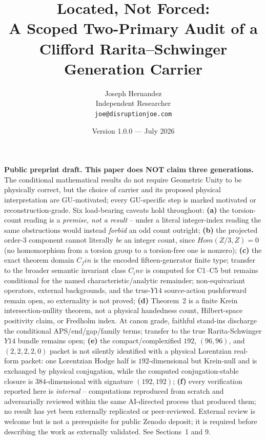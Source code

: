 \documentclass[11pt]{article}
\title{Located, Not Forced:\\
A Scoped Two-Primary Audit of a Clifford Rarita--Schwinger Generation Carrier}
\author{Joseph Hernandez\\Independent Researcher\\
\small\texttt{joe@disruptionjoe.com}}
\date{Version 1.0.0 --- July 2026}
\theoremstyle{remark}
\begin{document}
\maketitle

\textbf{Public preprint draft. This paper does NOT claim three generations.} The conditional mathematical results do not require Geometric Unity to be physically correct, but the choice of carrier and its proposed physical interpretation are GU-motivated; every GU-specific step is marked motivated or reconstruction-grade. Six load-bearing caveats hold throughout: \textbf{(a)} the torsion-count reading is a \emph{premise, not a result} -- under a literal integer-index reading the same obstructions would instead \emph{forbid} an odd count outright; \textbf{(b)} the projected order-3 component cannot literally \emph{be} an integer count, since $Hom(Z/3, Z) = 0$ (no homomorphism from a torsion group to a torsion-free one is nonzero); \textbf{(c)} the exact theorem domain $C_fin$ is the encoded fifteen-generator finite type; transfer to the broader semantic invariant class $C_inv$ is computed for C1--C5 but remains conditional for the named characteristic/analytic remainder; non-equivariant operators, external backgrounds, and the true-$Y14$ source-action pushforward remain open, so externality is not proved; \textbf{(d)} Theorem~2 is a finite Krein intersection-nullity theorem, not a physical handedness count, Hilbert-space positivity claim, or Fredholm index. At canon grade, faithful stand-ins discharge the conditional APS/end/gap/family terms; transfer to the true Rarita-Schwinger $Y14$ bundle remains open; \textbf{(e)} the compact/complexified $192$, $(96,96)$, and $(2,2,2,2,0)$ packet is not silently identified with a physical Lorentzian real-form packet: one Lorentzian Hodge half is $192$-dimensional but Krein-null and is exchanged by physical conjugation, while the computed conjugation-stable closure is $384$-dimensional with signature $(192,192)$; \textbf{(f)} every verification reported here is \emph{internal} -- computations reproduced from scratch and adversarially reviewed within the same AI-directed process that produced them; no result has yet been externally replicated or peer-reviewed. External review is welcome but is not a prerequisite for public Zenodo deposit; it is required before describing the work as externally validated. See Sections~1 and 9.
\end{document}
